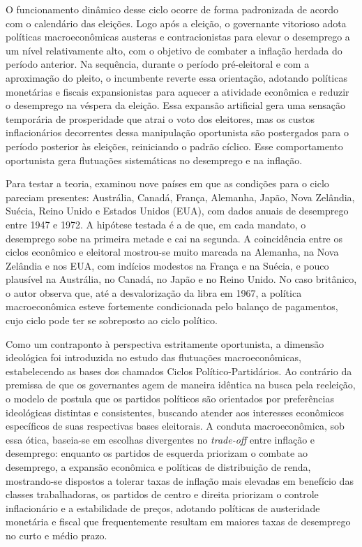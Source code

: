 O funcionamento dinâmico desse ciclo ocorre de forma padronizada de acordo com o calendário das eleições. Logo após a eleição, o governante vitorioso adota políticas macroeconômicas austeras e contracionistas para elevar o desemprego a um nível relativamente alto, com o objetivo de combater a inflação herdada do período anterior. Na sequência, durante o período pré-eleitoral e com a aproximação do pleito, o incumbente reverte essa orientação, adotando políticas monetárias e fiscais expansionistas para aquecer a atividade econômica e reduzir o desemprego na véspera da eleição. Essa expansão artificial gera uma sensação temporária de prosperidade que atrai o voto dos eleitores, mas os custos inflacionários decorrentes dessa manipulação oportunista são postergados para o período posterior às eleições, reiniciando o padrão cíclico. Esse comportamento oportunista gera flutuações sistemáticas no desemprego e na inflação.

Para testar a teoria, \textcite{nordhaus1975} examinou nove países em que as condições para o ciclo pareciam presentes: Austrália, Canadá, França, Alemanha, Japão, Nova Zelândia, Suécia, Reino Unido e Estados Unidos (EUA), com dados anuais de desemprego entre 1947 e 1972. A hipótese testada é a de que, em cada mandato, o desemprego sobe na primeira metade e cai na segunda. A coincidência entre os ciclos econômico e eleitoral mostrou-se muito marcada na Alemanha, na Nova Zelândia e nos EUA, com indícios modestos na França e na Suécia, e pouco plausível na Austrália, no Canadá, no Japão e no Reino Unido. No caso britânico, o autor observa que, até a desvalorização da libra em 1967, a política macroeconômica esteve fortemente condicionada pelo balanço de pagamentos, cujo ciclo pode ter se sobreposto ao ciclo político.

Como um contraponto à perspectiva estritamente oportunista, a dimensão ideológica foi introduzida no estudo das flutuações macroeconômicas, estabelecendo as bases dos chamados Ciclos Político-Partidários. Ao contrário da premissa de que os governantes agem de maneira idêntica na busca pela reeleição, o modelo de \textcite{hibbs1977} postula que os partidos políticos são orientados por preferências ideológicas distintas e consistentes, buscando atender aos interesses econômicos específicos de suas respectivas bases eleitorais. A conduta macroeconômica, sob essa ótica, baseia-se em escolhas divergentes no \textit{trade-off} entre inflação e desemprego: enquanto os partidos de esquerda priorizam o combate ao desemprego, a expansão econômica e políticas de distribuição de renda, mostrando-se dispostos a tolerar taxas de inflação mais elevadas em benefício das classes trabalhadoras, os partidos de centro e direita priorizam o controle inflacionário e a estabilidade de preços, adotando políticas de austeridade monetária e fiscal que frequentemente resultam em maiores taxas de desemprego no curto e médio prazo.

